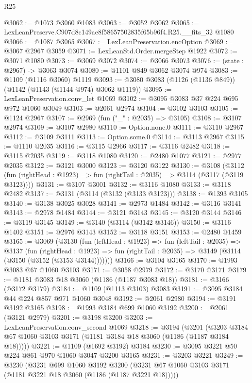 \begin{lexlean}{R25}
\begin{coremodule}
@3062 := @1073 @3060 @1083
@3063 := @3052 @3062
@3065 := LexLeanPreserve.C907d8c149ae8f58657502835f65b96f4.R25.__fits_32 @1080
@3066 := @1087 @3065
@3067 := LexLeanPreservation.encOption
@3069 := @3067 @2967 @3059
@3071 := LexLeanStd.Order.mergeStep @1922
@3072 := @3071 @1080
@3073 := @3069 @3072
@3074 := @3066 @3073
@3076 := (state : @2967) -> @3063 @3074
@3080 := @1101 @849 @3062 @3074 @974
@3083 := @1109 (@1116 @3060) @1119
@3093 := @3080 @3083 (@1126 (@1136 @849)) (@1142 (@1143 (@1144 @974) @3062 @1119))
@3095 := LexLeanPreservation.conv_let @1069
@3102 := @3095 @3083 @37 @224 @695 @972 @1060 @3049
@3103 := @2061 @2974
@3104 := @3102 @3103
@3105 := @1124 @2967
@3107 := @2969 (fun ("_" : @2035) => @3105)
@3108 := @3107 @2974
@3109 := @3107 @2980
@3110 := Option.none.{0}
@3111 := @3110 @2967
@3112 := @3109 @3111
@3113 := Option.some.{0}
@3114 := @3113 @2967
@3115 := @1110 @2035
@3116 := @3115 @2966
@3117 := @3116 @2482
@3118 := @3115 @2035
@3119 := @3118 @1080
@3120 := @2480 @1077
@3121 := @2977 @2035
@3122 := @3121 @3000
@3123 := @3120 @3122
@3130 := @3108
    (@3112 (fun (rightHead : @1923) => fun (rightTail : @2035) => @3114 (@3117 (@3119 @3123))))
@3131 := @3107 @3001
@3132 := @3116 @1080
@3133 := @3118 @2482
@3137 := @3131 (@3114 (@3132 (@3133 @3123)))
@3138 := @1393 @3105
@3140 := @3138 @3025 @3028
@3141 := @2973 @1484
@3142 := @3116 @3141
@3143 := @2978 @1484
@3144 := @3121 @3143
@3145 := @3120 @3144
@3146 := @3119 @3145
@3149 := @3140 (@3114 (@3142 @3146))
@3150 := @3116 @1402
@3151 := @2976 @3143
@3152 := @3118 @3151
@3153 := @2480 @1459
@3165 := @3069
    (@3130
      (fun (leftHead : @1923) =>
      fun (leftTail : @2035) =>
      @3137
        (fun (rightHead : @1923) =>
        fun (rightTail : @2035) => @3149 (@3114 (@3150 (@3152 (@3153 @3144)))))))
@3166 := @3104 @3165
@3170 := @1993 @3083 @67 @1060 @3103
@3171 := @3058 @2979
@3172 := @3170 @3171
@3179 := @1181 @3083 @18 @3060 (@1186 (@1187 @3083 @18))
@3181 := @3166 (@3172 @3179)
@3184 := @1109 (@1113 @3103) @3083
@3191 := @3095 @3184 @44 @224 @857 @971 @1060 @3048
@3192 := @2061 @2980
@3194 := @3191 @3192 @3165
@3198 := @1993 @3184 @699 @1060 @3192
@3200 := @2061 (@3121 @2979)
@3201 := @3198 @3200
@3203 := LexLeanPreservation.conv_second @1069
@3218 := @3194
    (@3201 (@3203 @3184 @67 @1060 @3103 @3171 (@1181 @3184 @18 @3060 (@1186 (@1187 @3184 @18)))))
@3221 := @1109 (@1692 @3192) @3184
@3230 := @3095 @3221 @50 @224 @861 @970 @1060 @3047 @3200 @3165
@3231 := @3203 @3221
@3249 := @3230
    (@3231
      @699
      @1060
      @3192
      @3200
      (@3231 @67 @1060 @3103 @3171 (@1181 @3221 @18 @3060 (@1186 (@1187 @3221 @18)))))

\end{coremodule}
\end{lexlean}
